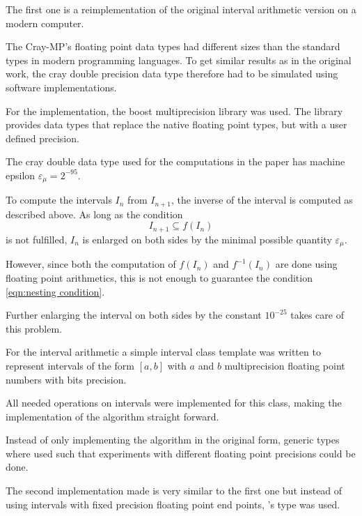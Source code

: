   The first one is a reimplementation of the original interval arithmetic version
  on a modern computer.
  
  The Cray-MP's floating point data types had different sizes than the
  standard types in modern programming languages.
  To get similar results as in the original work,  the cray double precision
  data type therefore had to be simulated using software implementations.
  
  For the \cc implementation, the boost multiprecision library \cite{boostmultiprecision} was used. 
  The library provides data types that replace the native \cc floating point types, but with a user defined precision. 
 
  The cray double data type used for the computations in the paper has machine epsilon
  $\varepsilon_\mu = 2^{-95}$.

  To compute the intervals $I_n$ from $I_{n+1}$, the inverse of the interval is
  computed as described above. 
  As long as the condition 
  \begin{equation}\label{eqn:nesting condition}  
    I_{n+1} \subseteq f(I_n) 
  \end{equation}
  is not fulfilled, $I_n$ is enlarged on both sides by the minimal possible quantity $\varepsilon_\mu$. 

  However, since both the computation of $f(I_n)$ and $f^{-1}(I_n)$ are done using
  floating point arithmetics, this is not enough to guarantee the condition
  \ref{eqn:nesting condition}.
  
  Further enlarging the interval on both sides by the constant $10^{-25}$
  takes care of this problem.
  
  For the interval arithmetic a simple interval class template
   was written to represent
  intervals of the form $[a,b]$ with $a$ and $b$ multiprecision floating point
  numbers with  bits precision. 

  All needed operations on intervals were implemented for this class, making
  the implementation of the algorithm straight forward.

  Instead of only implementing the algorithm in the original form, generic
  types where used such that experiments with different floating point precisions could be
  done.

  The second implementation made is very similar to the first one but instead
  of using intervals with fixed precision floating point end points, \irram's
   type was used.

